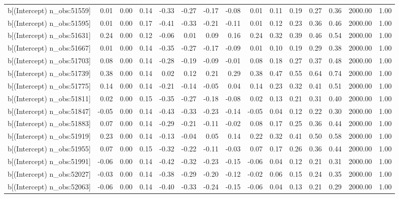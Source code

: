 \begin{table}[ht]
\begin{tabular}{rrrrrrrrrrrrrrr}
  b[(Intercept) n\_obs:51559] & 0.01 & 0.00 & 0.14 & -0.33 & -0.27 & -0.17 & -0.08 & 0.01 & 0.11 & 0.19 & 0.27 & 0.36 & 2000.00 & 1.00 \\ 
  b[(Intercept) n\_obs:51595] & 0.01 & 0.00 & 0.17 & -0.41 & -0.33 & -0.21 & -0.11 & 0.01 & 0.12 & 0.23 & 0.36 & 0.46 & 2000.00 & 1.00 \\ 
  b[(Intercept) n\_obs:51631] & 0.24 & 0.00 & 0.12 & -0.06 & 0.01 & 0.09 & 0.16 & 0.24 & 0.32 & 0.39 & 0.46 & 0.54 & 2000.00 & 1.00 \\ 
  b[(Intercept) n\_obs:51667] & 0.01 & 0.00 & 0.14 & -0.35 & -0.27 & -0.17 & -0.09 & 0.01 & 0.10 & 0.19 & 0.29 & 0.38 & 2000.00 & 1.00 \\ 
  b[(Intercept) n\_obs:51703] & 0.08 & 0.00 & 0.14 & -0.28 & -0.19 & -0.09 & -0.01 & 0.08 & 0.18 & 0.27 & 0.37 & 0.48 & 2000.00 & 1.00 \\ 
  b[(Intercept) n\_obs:51739] & 0.38 & 0.00 & 0.14 & 0.02 & 0.12 & 0.21 & 0.29 & 0.38 & 0.47 & 0.55 & 0.64 & 0.74 & 2000.00 & 1.00 \\ 
  b[(Intercept) n\_obs:51775] & 0.14 & 0.00 & 0.14 & -0.21 & -0.14 & -0.05 & 0.04 & 0.14 & 0.23 & 0.32 & 0.41 & 0.51 & 2000.00 & 1.00 \\ 
  b[(Intercept) n\_obs:51811] & 0.02 & 0.00 & 0.15 & -0.35 & -0.27 & -0.18 & -0.08 & 0.02 & 0.13 & 0.21 & 0.31 & 0.40 & 2000.00 & 1.00 \\ 
  b[(Intercept) n\_obs:51847] & -0.05 & 0.00 & 0.14 & -0.43 & -0.33 & -0.23 & -0.14 & -0.05 & 0.04 & 0.12 & 0.22 & 0.30 & 2000.00 & 1.00 \\ 
  b[(Intercept) n\_obs:51883] & 0.07 & 0.00 & 0.14 & -0.29 & -0.21 & -0.11 & -0.02 & 0.08 & 0.17 & 0.25 & 0.36 & 0.44 & 2000.00 & 1.00 \\ 
  b[(Intercept) n\_obs:51919] & 0.23 & 0.00 & 0.14 & -0.13 & -0.04 & 0.05 & 0.14 & 0.22 & 0.32 & 0.41 & 0.50 & 0.58 & 2000.00 & 1.00 \\ 
  b[(Intercept) n\_obs:51955] & 0.07 & 0.00 & 0.15 & -0.32 & -0.22 & -0.11 & -0.03 & 0.07 & 0.17 & 0.26 & 0.36 & 0.44 & 2000.00 & 1.00 \\ 
  b[(Intercept) n\_obs:51991] & -0.06 & 0.00 & 0.14 & -0.42 & -0.32 & -0.23 & -0.15 & -0.06 & 0.04 & 0.12 & 0.21 & 0.31 & 2000.00 & 1.00 \\ 
  b[(Intercept) n\_obs:52027] & -0.03 & 0.00 & 0.14 & -0.38 & -0.29 & -0.20 & -0.12 & -0.02 & 0.06 & 0.15 & 0.24 & 0.35 & 2000.00 & 1.00 \\ 
  b[(Intercept) n\_obs:52063] & -0.06 & 0.00 & 0.14 & -0.40 & -0.33 & -0.24 & -0.15 & -0.06 & 0.04 & 0.13 & 0.21 & 0.29 & 2000.00 & 1.00 \\ 

\end{tabular}
\end{table}
